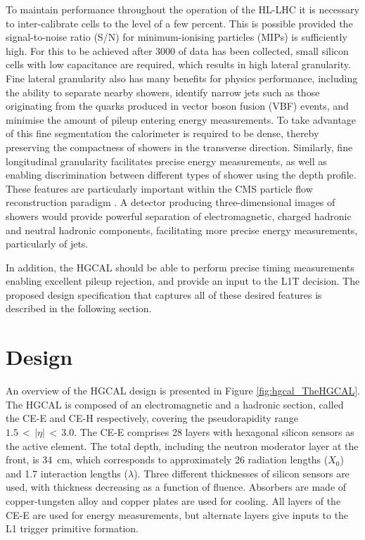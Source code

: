 To maintain performance throughout the operation of the HL-LHC it is necessary to inter-calibrate cells to the level of a few percent.
This is possible provided the signal-to-noise ratio (S/N) for minimum-ionising particles (MIPs) is sufficiently high.
For this to be achieved after \SI{3000}{\fbinv} of data has been collected, small silicon cells with low capacitance are required, which results in high lateral granularity.
Fine lateral granularity also has many benefits for physics performance, including the ability to separate nearby showers, 
identify narrow jets such as those originating from the quarks produced in vector boson fusion (VBF) events, and minimise the amount of pileup entering energy measurements.
To take advantage of this fine segmentation the calorimeter is required to be dense, thereby preserving the compactness of showers in the transverse direction.
Similarly, fine longitudinal granularity facilitates precise energy measurements, as well as enabling discrimination between different types of shower using the depth profile.
These features are particularly important within the CMS particle flow reconstruction paradigm \cite{ParticleFlow}.
A detector producing three-dimensional images of showers would provide powerful separation of electromagnetic, charged hadronic and neutral hadronic components,
facilitating more precise energy measurements, particularly of jets.

In addition, the HGCAL should be able to perform precise timing measurements enabling excellent pileup rejection, and provide an input to the L1T decision.
The proposed design specification that captures all of these desired features is described in the following section.

\section{Design}

An overview of the HGCAL design is presented in Figure \ref{fig:hgcal_TheHGCAL}.
The HGCAL is composed of an electromagnetic and a hadronic section, called the CE-E and CE-H respectively, covering the pseudorapidity range $1.5\,<\,|\eta|\,<\,3.0$.
The CE-E comprises 28 layers with hexagonal silicon sensors as the active element.
The total depth, including the neutron moderator layer at the front, is \SI{34}{cm}, which corresponds to approximately 26 radiation lengths ($X_0$) and 1.7 interaction lengths ($\lambda$).
Three different thicknesses of silicon sensors are used, with thickness decreasing as a function of fluence.
Absorbers are made of copper-tungsten alloy and copper plates are used for cooling.
All layers of the CE-E are used for energy measurements, but alternate layers give inputs to the L1 trigger primitive formation. %


